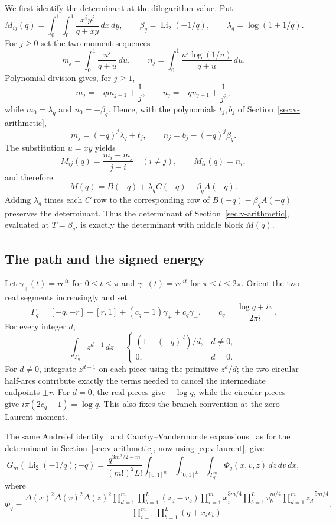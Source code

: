 We first identify the determinant at the dilogarithm value. Put
\[
 M_{ij}(q)=\int_0^1\!\int_0^1\frac{x^i y^j}{q+xy}\,dx\,dy,
 \qquad \beta_q=\operatorname{Li}_2(-1/q),
 \qquad \lambda_q=\log(1+1/q).
\]
For $j\ge0$ set the two moment sequences
\[
 m_j=\int_0^1\frac{u^j}{q+u}\,du,
 \qquad n_j=\int_0^1\frac{u^j\log(1/u)}{q+u}\,du.
\]
Polynomial division gives, for $j\ge1$,
\[
 m_j=-q m_{j-1}+\frac1j,\qquad
 n_j=-q n_{j-1}+\frac1{j^2},
\]
while $m_0=\lambda_q$ and $n_0=-\beta_q$. Hence, with the
polynomials $t_j,b_j$ of Section~\ref{sec:v-arithmetic},
\[
 m_j=(-q)^j\lambda_q+t_j,\qquad n_j=b_j-(-q)^j\beta_q.
\]
The substitution $u=xy$ yields
\[
 M_{ij}(q)=\frac{m_i-m_j}{j-i}\quad(i\ne j),
 \qquad M_{ii}(q)=n_i,
\]
and therefore
\begin{equation}\label{eq:v-moment-identity}
 M(q)=B(-q)+\lambda_q C(-q)-\beta_q A(-q).
\end{equation}
Adding $\lambda_q$ times each $C$ row to the corresponding row of
$B(-q)-\beta_qA(-q)$ preserves the determinant. Thus the determinant of
Section~\ref{sec:v-arithmetic}, evaluated at $T=\beta_q$,
is exactly the determinant with middle block $M(q)$.

\subsection{The path and the signed energy}

Let $\gamma_+(t)=re^{it}$ for $0\le t\le\pi$ and
$\gamma_-(t)=re^{it}$ for $\pi\le t\le2\pi$.  Orient the two real
segments increasingly and set
\begin{equation}\label{eq:v-path}
 \Gamma_q=[-q,-r]+[r,1]+(c_q-1)\gamma_++c_q\gamma_-,
 \qquad c_q=\frac{\log q+i\pi}{2\pi i}.
\end{equation}
For every integer $d$,
\begin{equation}\label{eq:v-laurent}
 \int_{\Gamma_q}z^{d-1}\,dz=
 \begin{cases}(1-(-q)^d)/d,&d\ne0,\\0,&d=0.\end{cases}
\end{equation}
For $d\ne0$, integrate $z^{d-1}$ on each piece using the primitive
$z^d/d$; the two circular half-arcs contribute exactly the terms needed
to cancel the intermediate endpoints $\pm r$.  For $d=0$, the real pieces
give $-\log q$, while the circular pieces give
$i\pi(2c_q-1)=\log q$.  This also fixes the branch convention at the
zero Laurent moment.

The same Andreief identity~\cite{Andreief,Forrester} and Cauchy--Vandermonde
expansions~\cite{Krattenthaler} as for the determinant
in Section~\ref{sec:v-arithmetic}, now using \eqref{eq:v-laurent}, give
\begin{equation}\label{eq:v-integral}
 G_m(\operatorname{Li}_2(-1/q);-q)
 =\frac{q^{3m^2/2-m}}{(m!)^2L!}
   \int_{[0,1]^m}\int_{[0,1]^L}\int_{\Gamma_q^m}
       \Phi_q(x,v,z)\,dz\,dv\,dx,
\end{equation}
where
\[
 \Phi_q=\frac{\Delta(x)^2\Delta(v)^2\Delta(z)^2
       \prod_{d=1}^m\prod_{b=1}^L(z_d-v_b)
       \prod_{i=1}^m x_i^{3m/4}
       \prod_{b=1}^L v_b^{m/4}
       \prod_{d=1}^m z_d^{-5m/4}}
       {\prod_{i=1}^m\prod_{b=1}^L(q+x_iv_b)}.
\]

